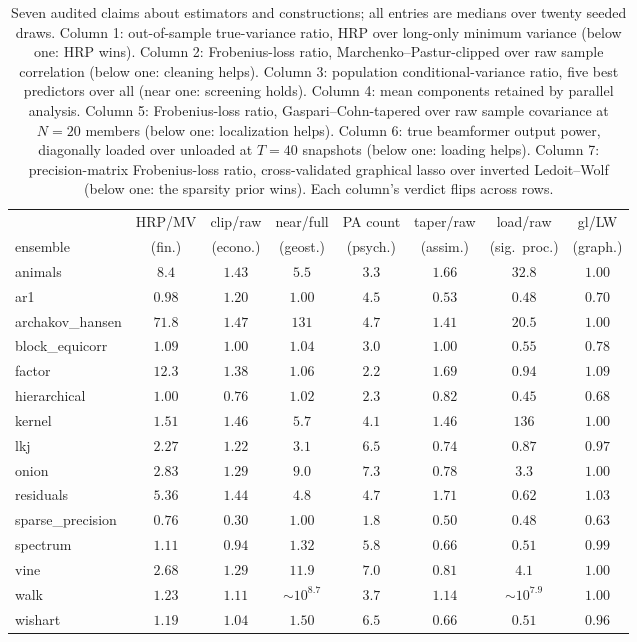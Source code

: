 \documentclass[11pt]{article}
\begin{document}
\begin{table}[t]
\centering\footnotesize
\setlength{\tabcolsep}{4.5pt}
\begin{tabular}{lccccccc}
\toprule
 & HRP/MV & clip/raw & near/full & PA count & taper/raw & load/raw & gl/LW \\
ensemble & (fin.) & (econo.) & (geost.) & (psych.) & (assim.) & (sig.\
proc.) & (graph.) \\
\midrule
animals & $8.4$ & $1.43$ & $5.5$ & $3.3$ & $1.66$ & $32.8$ & $1.00$ \\
ar1 & $0.98$ & $1.20$ & $1.00$ & $4.5$ & $0.53$ & $0.48$ & $0.70$ \\
archakov\_hansen & $71.8$ & $1.47$ & $131$ & $4.7$ & $1.41$ & $20.5$ & $1.00$ \\
block\_equicorr & $1.09$ & $1.00$ & $1.04$ & $3.0$ & $1.00$ & $0.55$ & $0.78$ \\
factor & $12.3$ & $1.38$ & $1.06$ & $2.2$ & $1.69$ & $0.94$ & $1.09$ \\
hierarchical & $1.00$ & $0.76$ & $1.02$ & $2.3$ & $0.82$ & $0.45$ & $0.68$ \\
kernel & $1.51$ & $1.46$ & $5.7$ & $4.1$ & $1.46$ & $136$ & $1.00$ \\
lkj & $2.27$ & $1.22$ & $3.1$ & $6.5$ & $0.74$ & $0.87$ & $0.97$ \\
onion & $2.83$ & $1.29$ & $9.0$ & $7.3$ & $0.78$ & $3.3$ & $1.00$ \\
residuals & $5.36$ & $1.44$ & $4.8$ & $4.7$ & $1.71$ & $0.62$ & $1.03$ \\
sparse\_precision & $0.76$ & $0.30$ & $1.00$ & $1.8$ & $0.50$ & $0.48$ & $0.63$ \\
spectrum & $1.11$ & $0.94$ & $1.32$ & $5.8$ & $0.66$ & $0.51$ & $0.99$ \\
vine & $2.68$ & $1.29$ & $11.9$ & $7.0$ & $0.81$ & $4.1$ & $1.00$ \\
walk & $1.23$ & $1.11$ & $\sim\!10^{8.7}$ & $3.7$ & $1.14$ & $\sim\!10^{7.9}$ & $1.00$ \\
wishart & $1.19$ & $1.04$ & $1.50$ & $6.5$ & $0.66$ & $0.51$ & $0.96$ \\
\bottomrule
\end{tabular}
\caption{Seven audited claims about estimators and constructions; all
entries are medians over twenty seeded draws. Column 1: out-of-sample
true-variance ratio, HRP over long-only minimum variance (below one: HRP
wins). Column 2: Frobenius-loss ratio, Marchenko--Pastur-clipped over raw
sample correlation (below one: cleaning helps). Column 3: population
conditional-variance ratio, five best predictors over all (near one:
screening holds). Column 4: mean components retained by parallel
analysis. Column 5: Frobenius-loss ratio, Gaspari--Cohn-tapered over raw
sample covariance at $N=20$ members (below one: localization helps).
Column 6: true beamformer output power, diagonally loaded over unloaded
at $T=40$ snapshots (below one: loading helps). Column 7:
precision-matrix Frobenius-loss ratio, cross-validated graphical lasso
over inverted Ledoit--Wolf (below one: the sparsity prior wins). Each
column's verdict flips across rows.}\label{tab:audits}
\end{table}
\end{document}
